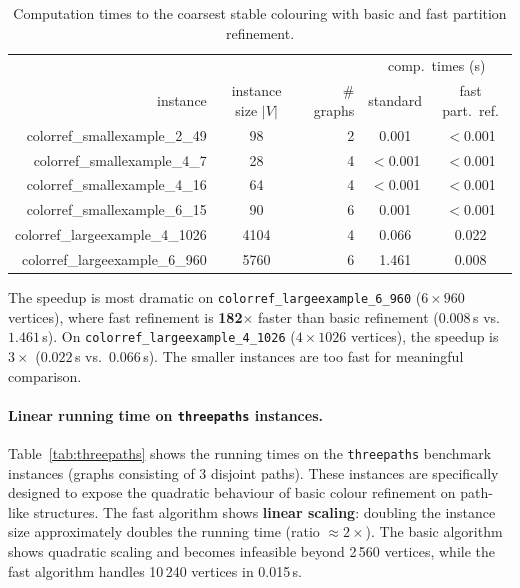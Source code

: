 \documentclass[twoside]{article}
\begin{document}
\begin{table}[H]
\centering
\begin{tabular}{r|c|r|c|c}
&&&\multicolumn{2}{c}{comp.\ times (s)}\\
instance & instance size $|V|$ & \# graphs & standard & fast part.\ ref.\\
\noalign{\smallskip}\hline\hline\noalign{\smallskip}
colorref\_smallexample\_2\_49    & 98   & 2 & 0.001  & $<$0.001 \\
colorref\_smallexample\_4\_7     & 28   & 4 & $<$0.001 & $<$0.001 \\
colorref\_smallexample\_4\_16    & 64   & 4 & $<$0.001 & $<$0.001 \\
colorref\_smallexample\_6\_15    & 90   & 6 & 0.001  & $<$0.001 \\
colorref\_largeexample\_4\_1026  & 4104 & 4 & 0.066  & 0.022 \\
colorref\_largeexample\_6\_960   & 5760 & 6 & 1.461  & 0.008 \\
\end{tabular}
\caption{Computation times to the coarsest stable colouring with basic and fast partition refinement.}
\label{tab:FPR}
\end{table}

The speedup is most dramatic on \texttt{colorref\_largeexample\_6\_960} ($6 \times 960$ vertices), where fast refinement is \textbf{182$\times$} faster than basic refinement ($0.008$\,s vs.\ $1.461$\,s). On \texttt{colorref\_largeexample\_4\_1026} ($4 \times 1026$ vertices), the speedup is $3\times$ ($0.022$\,s vs.\ $0.066$\,s). The smaller instances are too fast for meaningful comparison.

\paragraph{Linear running time on \texttt{threepaths} instances.}
Table~\ref{tab:threepaths} shows the running times on the \texttt{threepaths} benchmark instances (graphs consisting of 3 disjoint paths). These instances are specifically designed to expose the quadratic behaviour of basic colour refinement on path-like structures. The fast algorithm shows \textbf{linear scaling}: doubling the instance size approximately doubles the running time (ratio $\approx 2\times$). The basic algorithm shows quadratic scaling and becomes infeasible beyond 2\,560 vertices, while the fast algorithm handles 10\,240 vertices in 0.015\,s.
\end{document}
